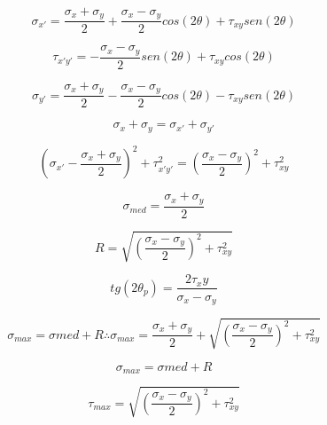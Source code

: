 \documentclass[a4paper]{article}
\begin{document}
		\begin{equation}
			\label{sigma_x'}
			\sigma_{x'} = \frac{\sigma_x + \sigma_y}{2} + \frac{\sigma_x - \sigma_y}{2}cos(2 \theta) + \tau_{xy}sen(2\theta)
		\end{equation}

		\begin{equation}
			\label{tau_xy'}	
			\tau_{x'y'} = -\frac{\sigma_x - \sigma_y}{2}sen(2 \theta) + \tau_{xy}cos(2\theta)
		\end{equation}

		\begin{equation}
			\label{sigma_y'}
			\sigma_{y'} = \frac{\sigma_x + \sigma_y}{2} - \frac{\sigma_x - \sigma_y}{2}cos(2 \theta) - \tau_{xy}sen(2\theta)
		\end{equation}

		\begin{equation}
			\sigma_x + \sigma_y = \sigma_{x'} + \sigma_{y'}
		\end{equation}

		\begin{equation}
			(\sigma_{x'} - \frac{\sigma_x + \sigma_y}{2})^2 + \tau_{x'y'}^2 = (\frac{\sigma_x - \sigma_y}{2})^2 + \tau_{xy}^2
		\end{equation}

		\begin{equation}
			\sigma_{med} = \frac{\sigma_x + \sigma_y}{2} 
		\end{equation}

		\begin{equation}
			R =  \sqrt{(\frac{\sigma_x - \sigma_y}{2})^2 + \tau_{xy}^2}  
		\end{equation}

		\begin{equation}
			tg(2\theta_p) = \frac{2\tau_xy}{\sigma_x - \sigma_y}
		\end{equation}

		\begin{equation}
			\sigma_{max} = \sigma{med} + R \therefore \sigma_{max} = \frac{\sigma_x + \sigma_y}{2} + \sqrt{(\frac{\sigma_x - \sigma_y}{2})^2 + \tau_{xy}^2}
		\end{equation}

		\begin{equation}
			\sigma_{max} = \sigma{med} + R
		\end{equation}

		\begin{equation}
			\tau_{max} = \sqrt{(\frac{\sigma_x - \sigma_y}{2})^2 + \tau_{xy}^2}
		\end{equation}
\end{document}
